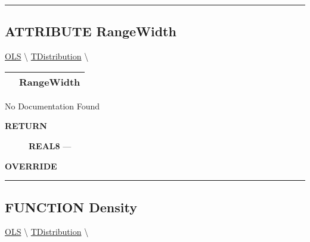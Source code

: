 \rule{\linewidth}{0.5pt}
\subsection*{\textsf{\colorbox{headtoc}{\color{white} ATTRIBUTE}
RangeWidth}}

\hypertarget{ecldoc:linearregression.ols.tdistribution.rangewidth}{}
\hspace{0pt} \hyperlink{ecldoc:linearregression.ols}{OLS} \textbackslash 
\hspace{0pt} \hyperlink{ecldoc:linearregression.ols.tdistribution}{TDistribution} \textbackslash 

{\renewcommand{\arraystretch}{1.5}
\begin{tabularx}{\textwidth}{|>{\raggedright\arraybackslash}l|X|}
\hline
\hspace{0pt}\mytexttt{\color{red} } & \textbf{RangeWidth} \\
\hline
\end{tabularx}
}

\par





No Documentation Found








\par
\begin{description}
\item [\colorbox{tagtype}{\color{white} \textbf{\textsf{RETURN}}}] \textbf{REAL8} --- 
\end{description}






\par
\begin{description}
\item [\colorbox{tagtype}{\color{white} \textbf{\textsf{OVERRIDE}}}] 
\end{description}



\rule{\linewidth}{0.5pt}
\subsection*{\textsf{\colorbox{headtoc}{\color{white} FUNCTION}
Density}}

\hypertarget{ecldoc:linearregression.ols.tdistribution.density}{}
\hspace{0pt} \hyperlink{ecldoc:linearregression.ols}{OLS} \textbackslash 
\hspace{0pt} \hyperlink{ecldoc:linearregression.ols.tdistribution}{TDistribution} \textbackslash 


